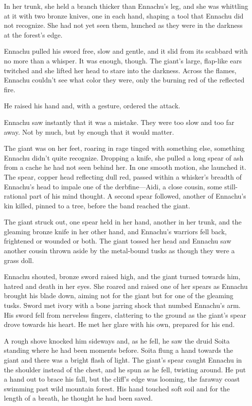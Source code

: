 In her trunk, she held a branch thicker than Ennachu's leg, and she was whittling at it with two bronze knives, one in each hand, shaping a tool that Ennachu did not recognize. She had not yet seen them, hunched as they were in the darkness at the forest's edge.

Ennachu pulled his sword free, slow and gentle, and it slid from its scabbard with no more than a whisper. It was enough, though. The giant's large, flap-like ears twitched and she lifted her head to stare into the darkness. Across the flames, Ennachu couldn't see what color they were, only the burning red of the reflected fire.

He raised his hand and, with a gesture, ordered the attack.

Ennachu saw instantly that it was a mistake. They were too slow and too far away. Not by much, but by enough that it would matter.

The giant was on her feet, roaring in rage tinged with something else, something Ennachu didn't quite recognize. Dropping a knife, she pulled a long spear of ash from a cache he had not seen behind her. In one smooth motion, she launched it. The spear, copper head reflecting dull red, passed within a whisker's breadth of Ennachu's head to impale one of the derbfine---Aidi, a close cousin, some still-rational part of his mind thought. A second spear followed, another of Ennachu's kin killed, pinned to a tree, before the band reached the giant.

The giant struck out, one spear held in her hand, another in her trunk, and the gleaming bronze knife in her other hand, and Ennachu's warriors fell back, frightened or wounded or both. The giant tossed her head and Ennachu saw another cousin thrown aside by the metal-bound tusks as though they were a grass doll.

Ennachu shouted, bronze sword raised high, and the giant turned towards him, hatred and death in her eyes. She roared and raised one of her spears as Ennachu brought his blade down, aiming not for the giant but for one of the gleaming tusks. Sword met ivory with a bone jarring shock that numbed Ennachu's arm. His sword fell from nerveless fingers, clattering to the ground as the giant's spear drove towards his heart. He met her glare with his own, prepared for his end.

A rough shove knocked him sideways and, as he fell, he saw the druid Soita standing where he had been moments before. Soita flung a hand towards the giant and there was a bright flash of light. The giant's spear caught Ennachu in the shoulder instead of the chest, and he spun as he fell, twisting around. He put a hand out to brace his fall, but the cliff's edge was looming, the faraway coast swimming past wild mountain forest. His hand touched soft soil and for the length of a breath, he thought he had been saved.

